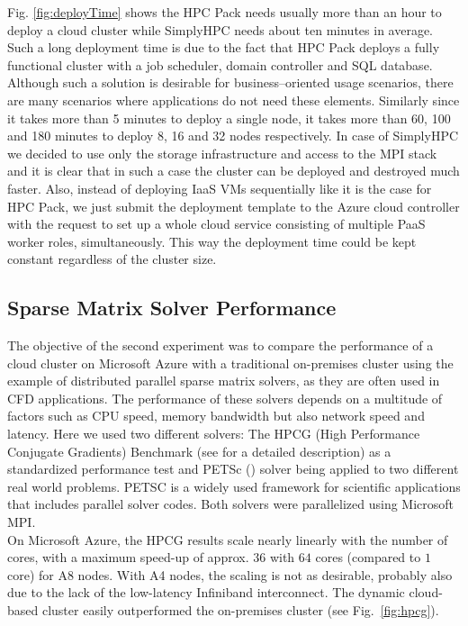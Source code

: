 \documentclass[3p,times]{elsarticle}
\begin{document}
Fig. \ref{fig:deployTime} shows the HPC Pack needs usually more than an hour to deploy a cloud cluster while SimplyHPC needs about ten minutes in average. Such a long deployment time is due to the fact that HPC Pack deploys a fully functional cluster with a job scheduler, domain controller and SQL database. Although such a solution is desirable for business--oriented usage scenarios, there are many scenarios where applications do not need these elements. Similarly since it takes more than 5 minutes to deploy a single node, it takes more than 60, 100 and 180 minutes to deploy 8, 16 and 32 nodes respectively. In case of SimplyHPC we decided to use only the storage infrastructure and access to the MPI stack and it is clear that in such a case the cluster can be deployed and destroyed much faster. Also, instead of deploying IaaS VMs sequentially like it is the case for HPC Pack, we just submit the deployment template to the Azure cloud controller with the request to set up a whole cloud service consisting of multiple PaaS worker roles, simultaneously. This way the deployment time could be kept constant regardless of the cluster size.

\subsection{Sparse Matrix Solver Performance}
The objective of the second experiment was to compare the performance of a cloud cluster on Microsoft Azure with a traditional on-premises cluster using the example of distributed parallel sparse matrix solvers, as they are often used in CFD applications. The performance of these solvers depends on a multitude of factors such as CPU speed, memory bandwidth but also network speed and latency. Here we used two different solvers: The HPCG (High Performance Conjugate Gradients) Benchmark (see \cite{hpcg} for a detailed description) as a standardized performance test and PETSc (\cite{petsc-web-page}) solver being applied to two different real world problems. PETSC is a widely used framework for scientific applications that includes parallel solver codes. Both solvers were parallelized using Microsoft MPI.\\
On Microsoft Azure, the HPCG results scale nearly linearly with the number of cores, with a maximum speed-up of approx. $36$ with $64$ cores (compared to $1$ core) for A8 nodes. With A4 nodes, the scaling is not as desirable, probably also due to the lack of the low-latency Infiniband interconnect. The dynamic cloud-based	cluster easily outperformed the on-premises cluster (see Fig.~\ref{fig:hpcg}). 
\end{document}
